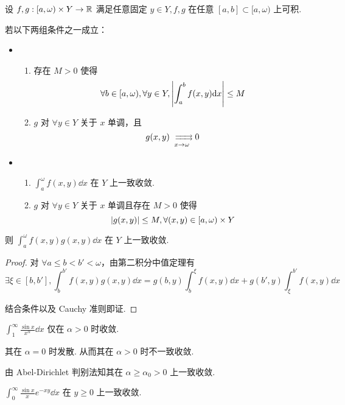 \begin{property}
    设 $f,g:[a,\omega)\times Y\to\mathbb{R}$ 满足任意固定 $y\in Y,f,g$ 在任意 $[a,b]\subset[a,\omega)$ 上可积.

    若以下两组条件之一成立：

    \begin{itemize}
        \item \begin{enumerate}
            \item 存在 $M>0$ 使得
$$
\forall b\in[a,\omega),\forall y\in Y,\left\lvert{\int_a^bf(x,y)\mathrm{d}x}\right\rvert\le M
$$

            \item $g$ 对 $\forall y\in Y$ 关于 $x$ 单调，且
$$
g(x,y)\xrightrightarrows[x\to\omega]{}0
$$
        \end{enumerate}

        \item \begin{enumerate}
            \item $\displaystyle\int_a^\omega f(x,y)\dd x$ 在 $Y$ 上一致收敛.
            
            \item $g$ 对 $\forall y\in Y$ 关于 $x$ 单调且存在 $M>0$ 使得
$$
\left\lvert{g(x,y)}\right\rvert\le M,\forall(x,y)\in[a,\omega)\times Y
$$
        \end{enumerate}
    \end{itemize}

    则 $\displaystyle\int_a^\omega f(x,y)g(x,y)\dd x$ 在 $Y$ 上一致收敛.
\end{property}
\begin{proof}
    对 $\forall a\le b<b'<\omega$，由第二积分中值定理有
$$
\exists\xi\in[b,b'],\int_b^{b'}f(x,y)g(x,y)\dd x=g(b,y)\int_b^\xi f(x,y)\dd x+g(b',y)\int_\xi^{b'}f(x,y)\dd x
$$

    结合条件以及 Cauchy 准则即证.
\end{proof}

\begin{example}
    $\displaystyle\int_1^\infty\frac{\sin x}{x^\alpha}\dd x$ 仅在 $\alpha>0$ 时收敛.

    其在 $\alpha=0$ 时发散. 从而其在 $\alpha>0$ 时不一致收敛.

    由 Abel-Dirichlet 判别法知其在 $\alpha\ge\alpha_0>0$ 上一致收敛.
\end{example}

\begin{example}
    $\displaystyle\int_0^\infty\frac{\sin x}{x}e^{-xy}\dd x$ 在 $y\ge 0$ 上一致收敛.
\end{example}

